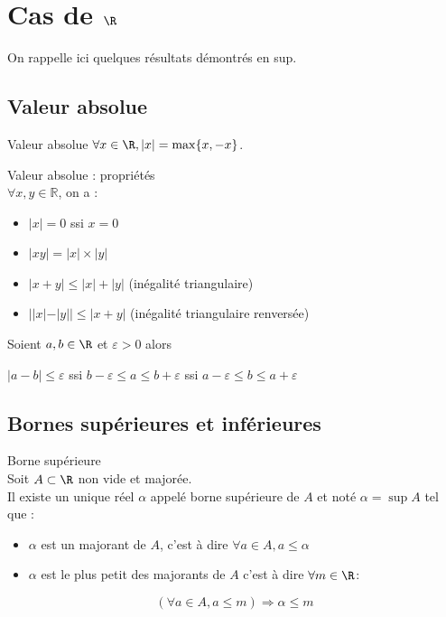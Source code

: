 \section{Cas de $\R$}

On rappelle ici quelques résultats démontrés en sup.

\subsection{Valeur absolue}

\begin{definition}{Valeur absolue}{}
    $\forall x \in \R, |x| = \max\{x, -x\}$.
\end{definition}

\begin{proposition}{Valeur absolue : propriétés}{}
    \\$\forall x, y \in \mathbb R$, on a : 

    \begin{itemize}
        \item $|x| = 0$ ssi $x = 0$
        \item $|xy| = |x| \times |y|$
        \item $|x + y| \leqslant |x| + |y|$ (inégalité triangulaire)
        \item $ | |x| - |y| | \leqslant |x + y|$ (inégalité triangulaire renversée)
    \end{itemize}
\end{proposition}


\begin{exemple}
    Soient $a, b \in \R$ et $\varepsilon > 0$ alors 

    $|a - b| \leqslant \varepsilon$ ssi $b - \varepsilon \leqslant a \leqslant b + \varepsilon$
    ssi $a - \varepsilon \leqslant b \leqslant a + \varepsilon$
\end{exemple}

\subsection{Bornes supérieures et inférieures}

\begin{theoreme}{Borne supérieure}{}
    \\Soit $A \subset \R$ non vide et majorée.\\

    Il existe un unique réel $\alpha$ appelé borne supérieure de $A$ et noté 
    $\alpha = \sup A$ tel que : 
    \begin{itemize}
        \item $\alpha$ est un majorant de $A$, c'est à dire $\forall a \in A, a \leqslant \alpha$
        \item $\alpha$ est le plus petit des majorants de $A$ c'est à dire $\forall m \in \R$: 
    \end{itemize}

    $$ (\forall a \in A, a \leqslant m ) \Rightarrow \alpha \leqslant m$$
\end{theoreme}


